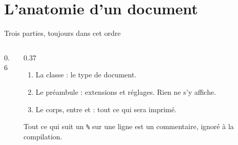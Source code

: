 \section{L'anatomie d'un document}

\begin{frame}[fragile]{Trois parties, toujours dans cet ordre}
  \begin{columns}[c]
    \begin{column}{0.6\textwidth}
    \end{column}
    \begin{column}{0.37\textwidth}
      \small
      \begin{enumerate}
        \item La classe : le type de document.
        \item Le préambule : extensions et réglages. Rien ne s'y
          affiche.
        \item Le corps, entre  et
           : tout ce qui sera imprimé.
      \end{enumerate}
      \vspace{4pt}
      Tout ce qui suit un \texttt{\%} sur une ligne est un commentaire,
      ignoré à la compilation.
    \end{column}
  \end{columns}
\end{frame}

